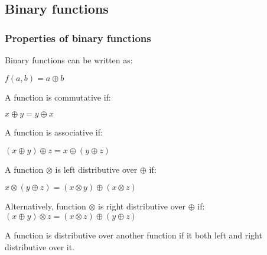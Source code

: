 
\subsection{Binary functions}

\subsubsection{Properties of binary functions}

Binary functions can be written as:

\(f(a,b)=a\oplus b\)

A function is commutative if:

\(x\oplus y = y\oplus x\)

A function is associative if:

\((x\oplus y)\oplus z = x\oplus (y\oplus z)\)

A function \(\otimes \) is left distributive over \(\oplus \) if:

\(x\otimes (y\oplus z)=(x\otimes y) \oplus (x\otimes z)\)

Alternatively, function \(\otimes \) is right distributive over \(\oplus \) if:
\((x\oplus y)\otimes z=(x\otimes z) \oplus (y\oplus z)\)

A function is distributive over another function if it both left and right distributive over it.

